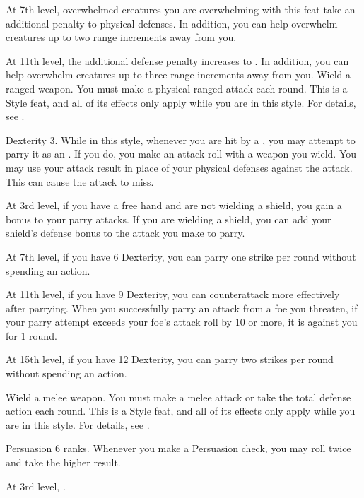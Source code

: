     At 7th level, overwhelmed creatures you are overwhelming with this feat take an additional  penalty to physical defenses.
    In addition, you can help overwhelm creatures up to two range increments away from you.

    At 11th level, the additional defense penalty increases to .
    In addition, you can help overwhelm creatures up to three range increments away from you.
    \stylereq Wield a ranged weapon.
    You must make a physical ranged attack each round.
     This is a Style feat, and all of its effects only apply while you are in this style.
    For details, see .

    \featpre Dexterity 3.
    \featben While in this style, whenever you are hit by a , you may attempt to parry it as an .
    If you do, you make an attack roll with a weapon you wield.
    You may use your attack result in place of your physical defenses against the attack.
    This can cause the attack to miss.

    At 3rd level, if you have a free hand and are not wielding a shield, you gain a  bonus to your parry attacks.
    If you are wielding a shield, you can add your shield's defense bonus to the attack you make to parry.

    At 7th level, if you have 6 Dexterity, you can parry one strike per round without spending an action.

    At 11th level, if you have 9 Dexterity, you can counterattack more effectively after parrying.
    When you successfully parry an attack from a foe you threaten, if your parry attempt exceeds your foe's attack roll by 10 or more, it is  against you for 1 round.

    At 15th level, if you have 12 Dexterity, you can parry two strikes per round without spending an action.

    \stylereq Wield a melee weapon.
    You must make a melee attack or take the total defense action each round.
     This is a Style feat, and all of its effects only apply while you are in this style.
    For details, see .

    \featpre Persuasion 6 ranks.
    \featben Whenever you make a Persuasion check, you may roll twice and take the higher result.

    At 3rd level, \tdash.

